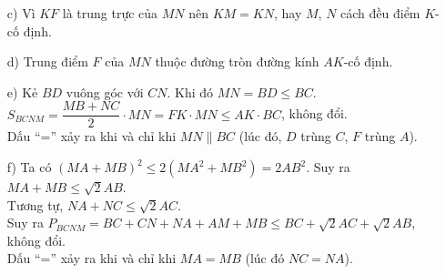 \begin{bt}
{{\begin{tikzpicture}[>=stealth,line join=round,line cap=round,font=\footnotesize,scale=1.1]
			\end{tikzpicture}
		}
		\begin{enumerate}
			\item[c)] Vì $KF$ là trung trực của $MN$ nên $KM=KN$, hay $M$, $N$ cách đều điểm $K$-cố định.
			\item[d)] Trung điểm $F$ của $MN$ thuộc đường tròn đường kính $AK$-cố định.
			\item[e)] Kẻ $BD$ vuông góc với $CN$. Khi đó $MN=BD\le BC$.\\
			$S_{BCNM}=\dfrac{MB+NC}{2}\cdot MN=FK\cdot MN\le AK\cdot BC$, không đổi.\\
			Dấu ``='' xảy ra khi và chỉ khi $MN\parallel BC$ (lúc đó, $D$ trùng $C$, $F$ trùng $A$).
			\item[f)] Ta có $(MA+MB)^2\le 2(MA^2+MB^2)=2AB^2$. Suy ra $MA+MB\le \sqrt2 AB$.\\
			Tương tự, $NA+NC\le \sqrt2 AC$.\\
			Suy ra $P_{BCNM}=BC+CN+NA+AM+MB\le BC+\sqrt2 AC+ \sqrt2 AB$, không đổi.\\
			Dấu ``='' xảy ra khi và chỉ khi $MA=MB$ (lúc đó $NC=NA$).
		\end{enumerate}
	}
\end{bt}
